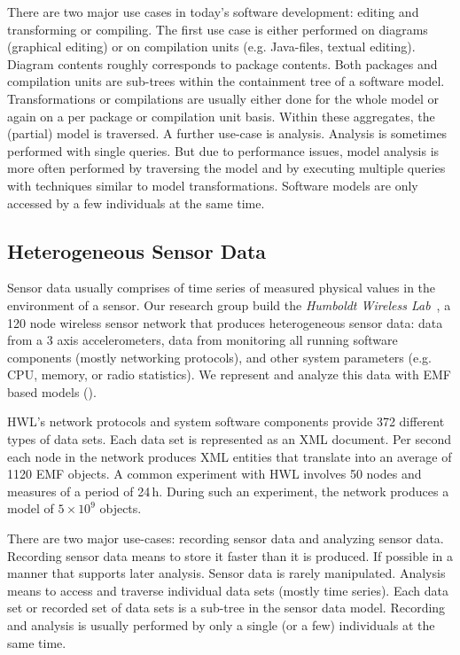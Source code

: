 There are two major use cases in today's software development: editing and transforming or compiling. The first use case is either performed on diagrams (graphical editing) or on compilation units (e.g. Java-files, textual editing). Diagram contents roughly corresponds to package contents. Both packages and compilation units are sub-trees within the containment tree of a software model.  Transformations or compilations are usually either done for the whole model or again on a per package or compilation unit basis. Within these aggregates, the (partial) model is traversed. A further use-case is analysis. Analysis is sometimes performed with single queries. But due to performance issues, model analysis is more often performed by traversing the model and by executing multiple queries with techniques similar to model transformations. Software models are only accessed by a few individuals at the same time.

\subsection{Heterogeneous Sensor Data}

Sensor data usually comprises of time series of measured physical values in the environment of a sensor. Our research group build the \emph{Humboldt Wireless Lab}~\cite{hwl}, a 120 node wireless sensor network that produces heterogeneous sensor data: data from a 3 axis accelerometers, data from monitoring all running software components (mostly networking protocols), and other system parameters (e.g. CPU, memory, or radio statistics). We represent and analyze this data with EMF based models (\cite{clickwatch}).


HWL's network protocols and system software components provide 372 different types of data sets. Each data set is represented as an XML document. Per second each node in the network produces XML entities that translate into an average of 1120 EMF objects. A common experiment with HWL involves 50 nodes and measures of a period of 24\,h. During such an experiment, the network produces a model of $5\times 10^9$ objects. 

There are two major use-cases: recording sensor data and analyzing sensor data. Recording sensor data means to store it faster than it is produced. If possible in a manner that supports later analysis. Sensor data is rarely manipulated. Analysis means to access and traverse individual data sets (mostly time series). Each data set or recorded set of data sets is a sub-tree in the sensor data model. Recording and analysis is usually performed by only a single (or a few) individuals at the same time. 

